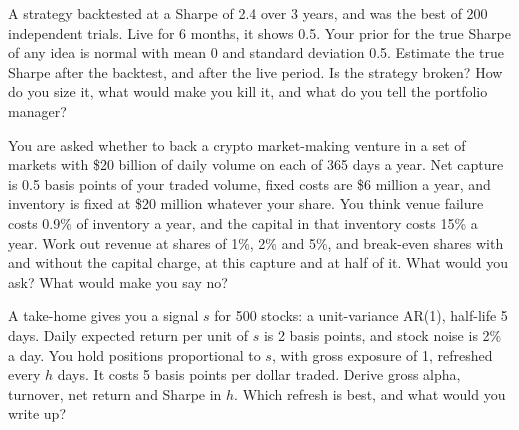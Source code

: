 \begin{question}\label{iq:iv2:research-and-strategy-cases:38}
A strategy backtested at a Sharpe of 2.4 over 3 years, and was the best of 200 independent trials. Live for 6 months, it shows 0.5. Your prior for the true Sharpe of any idea is normal with mean 0 and standard deviation 0.5. Estimate the true Sharpe after the backtest, and after the live period. Is the strategy broken? How do you size it, what would make you kill it, and what do you tell the portfolio manager?
\end{question}

\begin{question}\label{iq:iv2:research-and-strategy-cases:39}
You are asked whether to back a crypto market-making venture in a set of markets with \$20 billion of daily volume on each of 365 days a year. Net capture is 0.5 basis points of your traded volume, fixed costs are \$6 million a year, and inventory is fixed at \$20 million whatever your share. You think venue failure costs 0.9\% of inventory a year, and the capital in that inventory costs 15\% a year. Work out revenue at shares of 1\%, 2\% and 5\%, and break-even shares with and without the capital charge, at this capture and at half of it. What would you ask? What would make you say no?
\end{question}

\begin{question}\label{iq:iv2:research-and-strategy-cases:40}
A take-home gives you a signal $s$ for 500 stocks: a unit-variance AR(1), half-life 5 days. Daily expected return per unit of $s$ is 2 basis points, and stock noise is 2\% a day. You hold positions proportional to $s$, with gross exposure of 1, refreshed every $h$ days. It costs 5 basis points per dollar traded. Derive gross alpha, turnover, net return and Sharpe in $h$. Which refresh is best, and what would you write up?
\end{question}
